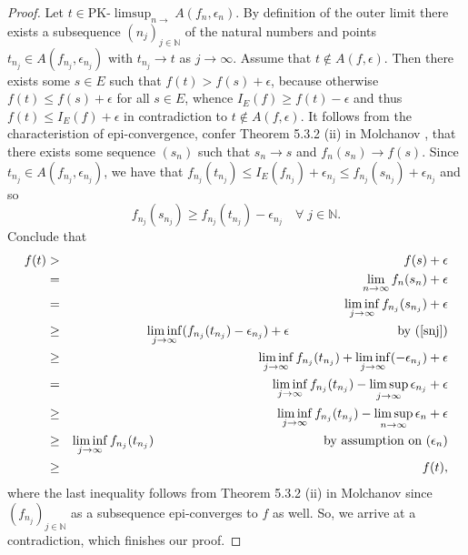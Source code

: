 \documentclass[sn-mathphys,Numbered]{sn-jnl}%
\theoremstyle{thmstyleone}%
\theoremstyle{thmstyletwo}%
\theoremstyle{thmstylethree}%
\begin{document}
\begin{proof} Let $t \in \text{PK-}\limsup_{n \rightarrow} A(f_n,\epsilon_n)$. By definition of the outer limit there exists a subsequence $(n_j)_{j \in \mathbb{N}}$ of the natural numbers and points $t_{n_j} \in
A(f_{n_j},\epsilon_{n_j})$ with $t_{n_j} \rightarrow t$ as $j \rightarrow \infty.$ Assume that $t \notin A(f,\epsilon)$. Then there exists some $s \in E$ such that $f(t)>f(s)+\epsilon$, because otherwise
$f(t) \le f(s)+\epsilon$ for all $s \in E$, whence $I_E(f) \ge f(t)-\epsilon$ and thus $f(t) \le I_E(f)+\epsilon$ in contradiction to $t \notin A(f,\epsilon)$. It follows from the characteristion of epi-convergence, confer Theorem 5.3.2 (ii) in Molchanov \cite{Molchanov}, that
there exists some sequence $(s_n)$ such that $s_n \rightarrow s$ and $f_n(s_n) \rightarrow f(s)$. Since $t_{n_j} \in A(f_{n_j},\epsilon_{n_j})$, we have that
$f_{n_j}(t_{n_j}) \le I_E(f_{n_j})+\epsilon_{n_j} \le f_{n_j}(s_{n_j})+\epsilon_{n_j}$ and so
\begin{equation} \label{snj}
 f_{n_j}(s_{n_j}) \ge f_{n_j}(t_{n_j}) - \epsilon_{n_j} \quad \forall \; j \in \mathbb{N}.
\end{equation}
Conclude that
\begin{eqnarray*}
f(t) &>& f(s) + \epsilon \\
     &=& \lim_{n \rightarrow \infty} f_n(s_n) + \epsilon\\
     &=& \liminf_{j \rightarrow \infty} f_{n_j}(s_{n_j}) + \epsilon\\
     &\ge& \liminf_{j \rightarrow \infty} (f_{n_j}(t_{n_j})- \epsilon_{n_j}) + \epsilon \hspace{3cm} \text{by } (\ref{snj})\\
     &\ge& \liminf_{j \rightarrow \infty} f_{n_j}(t_{n_j}) + \liminf_{j \rightarrow \infty} (-\epsilon_{n_j}) + \epsilon\\
     &=&  \liminf_{j \rightarrow \infty} f_{n_j}(t_{n_j}) - \limsup_{j \rightarrow \infty} \epsilon_{n_j} + \epsilon\\
     &\ge& \liminf_{j \rightarrow \infty} f_{n_j}(t_{n_j}) - \limsup_{n \rightarrow \infty} \epsilon_n + \epsilon\\
     &\ge& \liminf_{j \rightarrow \infty} f_{n_j}(t_{n_j}) \hspace{4.7cm} \text{by assumption on } (\epsilon_n)\\
     &\ge& f(t),
\end{eqnarray*}
where the last inequality follows from Theorem 5.3.2 (ii) in Molchanov \cite{Molchanov} since $(f_{n_j})_{j \in \mathbb{N}}$ as a subsequence epi-converges to $f$ as well.
So, we arrive at a contradiction, which finishes our proof.
\end{proof}
\end{document}
